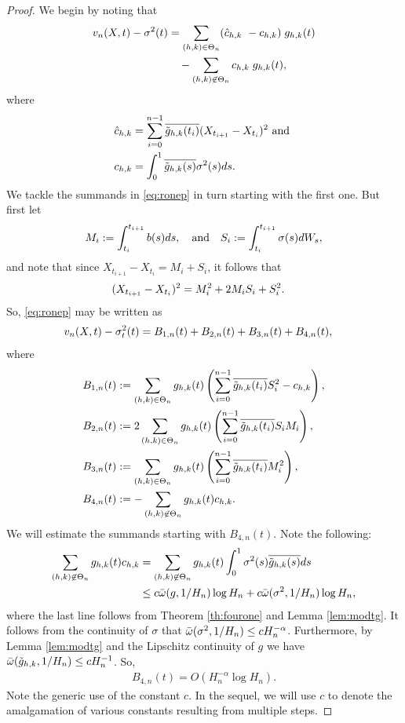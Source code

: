 \begin{proof} We begin by noting that 
\begin{align}
  v_n(X, t) - \sigma^2(t) & = \sum_{(h,k) \in \Theta_n} (\hat{c}_{h,k}\ - {c}_{h,k})\;g_{h,k}(t)\notag\\
  & \quad -\sum_{(h,k) \not\in \Theta_n} {c}_{h,k}\;g_{h,k}(t),\label{eq:ronep} 
\end{align}
  where 
\begin{align}  
  \hat{c}_{h,k} &= \sum_{i =0}^{n-1} \overline{\tilde{g}_{h,k}(t_i)} (X_{t_{i+1}} - X_{t_i})^2 \text{ and }\notag\\  
  {c}_{h,k} &= \int^1_0 \overline{\tilde{g}_{h,k}(s)} \sigma^2(s) d s. \notag
\end{align}
We tackle the summands in \eqref{eq:ronep} in turn starting with the first one. But first let 
\begin{align}
  M_i := \int_{t_i}^{t_{i+1}} b(s) d s, \quad \text{and} \quad  S_i := \int_{t_i}^{t_{i+1}} \sigma(s) d W_s, \notag
\end{align}
and note that since $X_{t_{i+1}} - X_{t_i} = M_i + S_i$, it follows that
\begin{align}
  (X_{t_{i+1}} - X_{t_i})^2 &= M_i^2  
  + 2M_iS_i +   S_i^2.\notag 
\end{align}
So, \eqref{eq:ronep} may be written as 
\begin{align}
  &v_n(X, t) - \sigma_t^2(t) = B_{1,n}(t) + B_{2,n}(t) + B_{3,n}(t) + B_{4,n}(t), \notag
\end{align}
where
\begin{align}
  &B_{1,n}(t) :=  \sum_{(h,k) \in \Theta_n} g_{h,k}(t) \left(\sum_{i=0}^{n-1} \overline{\tilde{g}_{h,k}(t_i)} S_i^2  - {c}_{h,k}\right), \notag\\
  &B_{2,n}(t) := 2 \sum_{(h,k) \in \Theta_n} g_{h,k}(t)\left(\sum_{i=0}^{n-1} \overline{\tilde{g}_{h,k}(t_i)} S_i M_i \right), \notag\\
  &B_{3,n}(t) := \sum_{(h,k) \in \Theta_n} g_{h,k}(t)\left( \sum_{i=0}^{n-1} \overline{\tilde{g}_{h,k}(t_i)} M_i^2 \right), \notag\\
  &B_{4,n}(t) := - \sum_{\substack{(h,k) \not\in \Theta_n }}g_{h,k}(t){c}_{h,k}. 
  \label{}
\end{align}
We will estimate the summands starting with $B_{4,n}(t)$. Note the following:
\begin{align}
  \sum_{\substack{(h,k) \not\in \Theta_n }}g_{h,k}(t){c}_{h,k} &=  \sum_{\substack{(h,k) \not\in \Theta_n }}g_{h,k}(t)\int^1_0\sigma^2 (s) { \overline{\tilde{g}_{h,k}(s)}} ds \notag\\ 
&\le c{\bar{\omega}}({g},1/H_n)\log H_n  + c{\bar{\omega}}({\sigma^2},1/H_n) \log H_n\notag,
\end{align}
where the last  line follows from Theorem \ref{th:fourone} and Lemma \ref{lem:modtg}. It follows from the \holder continuity of $\sigma$ that   ${\bar{\omega}}({\sigma^2},1/H_n) \le c H_n^{-\alpha}$. Furthermore, by Lemma \ref{lem:modtg} and the Lipschitz continuity of $g$ we have ${\bar{\omega}}({\tilde{g}_{h,k}},1/H_n) \le c H^{-1}_n$.  So,  
\begin{align}
 B_{4,n}(t) =  O( H_n^{-\alpha}\log H_n).
  \label{eq:B4}
\end{align}
Note the generic use of the constant  $c$. In the sequel, we will use $c$ to denote the amalgamation of various constants resulting from multiple steps. 


\end{proof}
